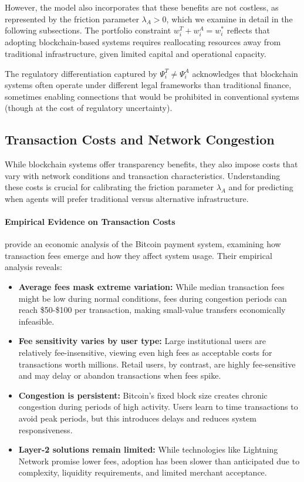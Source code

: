 However, the model also incorporates that these benefits are not costless, as represented by the friction parameter $\lambda_A > 0$, which we examine in detail in the following subsections. The portfolio constraint $w_i^T + w_i^A = w_i^*$ reflects that adopting blockchain-based systems requires reallocating resources away from traditional infrastructure, given limited capital and operational capacity.

The regulatory differentiation captured by $\Psi_i^T \neq \Psi_i^A$ acknowledges that blockchain systems often operate under different legal frameworks than traditional finance, sometimes enabling connections that would be prohibited in conventional systems (though at the cost of regulatory uncertainty).

\subsection{Transaction Costs and Network Congestion}

While blockchain systems offer transparency benefits, they also impose costs that vary with network conditions and transaction characteristics. Understanding these costs is crucial for calibrating the friction parameter $\lambda_A$ and for predicting when agents will prefer traditional versus alternative infrastructure.

\paragraph{Empirical Evidence on Transaction Costs}

 provide an economic analysis of the Bitcoin payment system, examining how transaction fees emerge and how they affect system usage. Their empirical analysis reveals:

\begin{itemize}
    \item \textbf{Average fees mask extreme variation:} While median transaction fees might be low during normal conditions, fees during congestion periods can reach \$50-\$100 per transaction, making small-value transfers economically infeasible.
    
    \item \textbf{Fee sensitivity varies by user type:} Large institutional users are relatively fee-insensitive, viewing even high fees as acceptable costs for transactions worth millions. Retail users, by contrast, are highly fee-sensitive and may delay or abandon transactions when fees spike.
    
    \item \textbf{Congestion is persistent:} Bitcoin's fixed block size creates chronic congestion during periods of high activity. Users learn to time transactions to avoid peak periods, but this introduces delays and reduces system responsiveness.
    
    \item \textbf{Layer-2 solutions remain limited:} While technologies like Lightning Network promise lower fees, adoption has been slower than anticipated due to complexity, liquidity requirements, and limited merchant acceptance.
\end{itemize}

